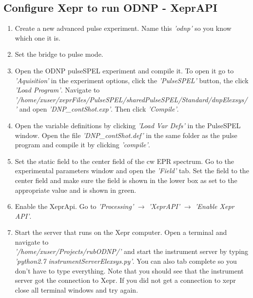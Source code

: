 \documentclass{article}
\newcommand{\fc}[1]{{\color{blue}\textit{'{#1}'}}}
\begin{document}
\subsection{Configure Xepr to run ODNP - XeprAPI}
\begin{enumerate}
    \item Create a new advanced pulse experiment. Name this \fc{odnp} so you know which one it is.
    \item Set the bridge to pulse mode.
    \item Open the ODNP pulseSPEL experiment and compile it. To open it go to \fc{Aquisition} in the experiment options, click the \fc{PulseSPEL} button, the click \fc{Load Program}. Navigate to \\ \fc{/home/xuser/xeprFiles/PulseSPEL/sharedPulseSPEL/Standard/dnpElexsys/} and open \fc{DNP\_contShot.exp}. Then click \fc{Compile}.
    \item Open the variable definitions by clicking \fc{Load Var Defs} in the PulseSPEL window. Open the file \fc{DNP\_contShot.def} in the same folder as the pulse program and compile it by clicking \fc{compile}.
    \item Set the static field to the center field of the cw EPR spectrum. Go to the experimental parameters window and open the \fc{Field} tab. Set the field to the center field and make sure the field is shown in the lower box as set to the appropriate value and is shown in green.
    \item Enable the XeprApi. Go to \fc{Processing} $\rightarrow$ \fc{XeprAPI} $\rightarrow$ \fc{Enable Xepr API}.
    \item Start the server that runs on the Xepr computer. Open a terminal and navigate to\\ \fc{/home/xuser/Projects/rubODNP/} and start the instrument server by typing \fc{python2.7 instrumentServerElexsys.py}. You can also tab complete so you don't have to type everything. Note that you should see that the instrument server got the connection to Xepr. If you did not get a connection to xepr close all terminal windows and try again.
\end{enumerate}
\end{document}
